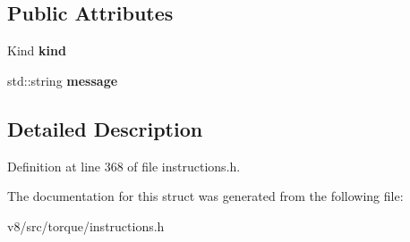 \subsection*{Public Attributes}
\begin{DoxyCompactItemize}
\item 
\mbox{\label{structv8_1_1internal_1_1torque_1_1AbortInstruction_a73156ceca435b94a4c54d8c32a544df4}} 
Kind {\bfseries kind}
\item 
\mbox{\label{structv8_1_1internal_1_1torque_1_1AbortInstruction_a9a84b9d1c38af3f3ac2fb3129cd27648}} 
std\+::string {\bfseries message}
\end{DoxyCompactItemize}


\subsection{Detailed Description}


Definition at line 368 of file instructions.\+h.



The documentation for this struct was generated from the following file\+:\begin{DoxyCompactItemize}
\item 
v8/src/torque/instructions.\+h\end{DoxyCompactItemize}
